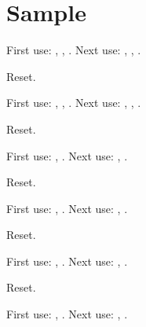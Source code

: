 \documentclass{article}
\begin{document}
\tableofcontents

\section{Sample}

First use: , , . Next use: , , .

Reset. \glsresetall

First use: , , . Next use:
, , .

Reset. \glsresetall

First use: , . Next use: , .

Reset. \glsresetall

First use: , . Next use: , .

Reset. \glsresetall

First use: , . Next use: , .

Reset. \glsresetall

First use: , . Next use: , .

\printglossary[style=plist]

\printacronyms
\end{document}
